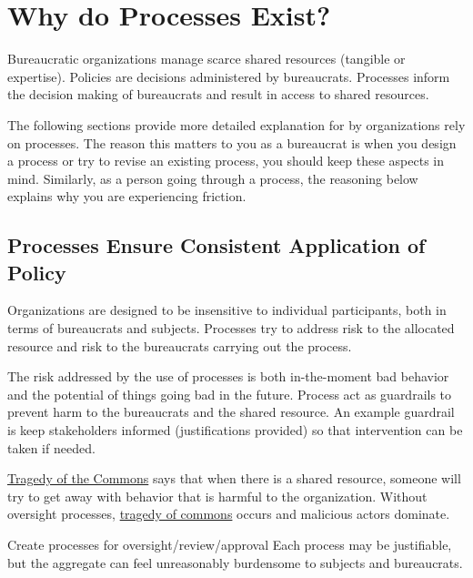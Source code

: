 \section{Why do Processes Exist?}

Bureaucratic organizations manage scarce shared resources (tangible or expertise). Policies are decisions administered by bureaucrats. Processes inform the decision making of bureaucrats and result in access to shared resources. 

The following sections provide more detailed explanation for by organizations rely on processes. The reason this matters to you as a bureaucrat is when you design a process or try to revise an existing process, you should keep these aspects in mind. Similarly, as a person going through a process, the reasoning below explains why you are experiencing friction. 

\subsection*{Processes Ensure Consistent Application of Policy}

Organizations are designed to be insensitive to individual participants, both in terms of bureaucrats and subjects. Processes try to address risk to the allocated resource and risk to the bureaucrats carrying out the process.

The risk addressed by the use of processes is both in-the-moment bad behavior and the potential of things going bad in the future. Process act as guardrails to prevent harm to the bureaucrats and the shared resource. An example guardrail is keep stakeholders informed (justifications provided) so that intervention can be taken if needed. 

\href{https://en.wikipedia.org/wiki/Tragedy_of_the_commons}{Tragedy of the Commons} says that when there is a shared resource, someone will try to get away with behavior that is harmful to the organization.
Without oversight processes, \href{https://en.wikipedia.org/wiki/Tragedy_of_the_commons}{tragedy of commons} occurs and malicious actors dominate.


Create processes for oversight/review/approval
Each process may be justifiable, but the aggregate can feel unreasonably burdensome to subjects and bureaucrats.





